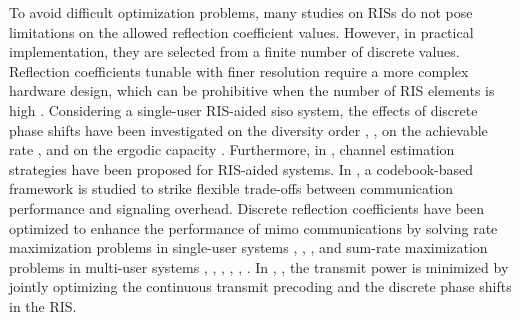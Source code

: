 \documentclass[twocolumn,10pt]{IEEEtran}
\begin{document}
To avoid difficult optimization problems, many studies on RISs do not pose limitations on the allowed reflection coefficient values.
However, in practical implementation, they are selected from a finite number of discrete values.
Reflection coefficients tunable with finer resolution require a more complex hardware design, which can be prohibitive when the number of RIS elements is high \cite{wu21}.
Considering a single-user RIS-aided \gls{siso} system, the effects of discrete phase shifts have been investigated on the diversity order \cite{bad19}, \cite{xu21}, on the achievable rate \cite{zha20b}, and on the ergodic capacity \cite{li20}.
Furthermore, in \cite{liu20,an21,wei21,wan21},
channel estimation strategies have been proposed for RIS-aided systems.
In \cite{an22}, a codebook-based framework is studied to strike flexible trade-offs between communication performance and signaling overhead.
%
Discrete reflection coefficients have been optimized to enhance the performance of \gls{mimo} communications by solving rate maximization problems in single-user systems \cite{xu19}, \cite{you20}, \cite{abe20}, \cite{qi20} and sum-rate maximization problems in multi-user systems \cite{guo19}, \cite{di20}, \cite{mu20}, \cite{jun21}, \cite{zha21}, \cite{zha21b}.
In \cite{wu19b}, \cite{fu21}, the transmit power is minimized by jointly optimizing the continuous transmit precoding and the discrete phase shifts in the RIS.
\end{document}

